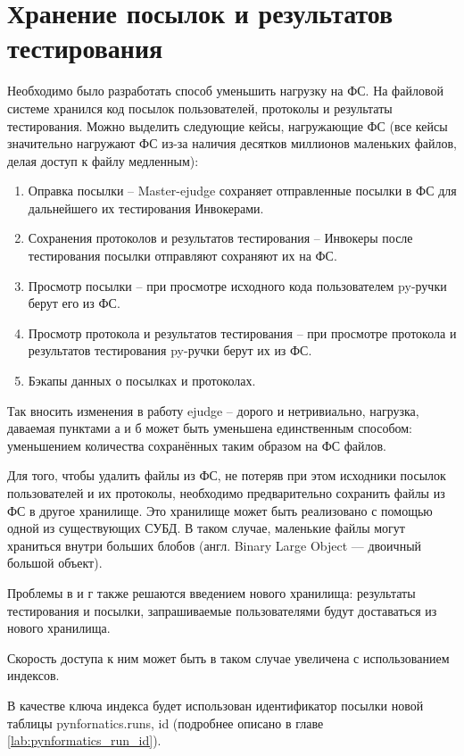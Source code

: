 \section{Хранение посылок и результатов тестирования}

Необходимо было разработать способ уменьшить нагрузку на ФС.
На файловой системе хранился код посылок пользователей,
протоколы и результаты тестирования.
Можно выделить следующие кейсы, нагружающие ФС (все кейсы значительно нагружают ФС из-за наличия десятков миллионов маленьких файлов, делая доступ к файлу медленным):

\begin{enumerate}
    \item Оправка посылки -- Master-ejudge сохраняет отправленные посылки в ФС для дальнейшего их тестирования Инвокерами.
    \item Сохранения протоколов и результатов тестирования -- Инвокеры после тестирования посылки отправляют сохраняют их на ФС.
    \item Просмотр посылки -- при просмотре исходного кода пользователем py-ручки берут его из ФС.
    \item Просмотр протокола и результатов тестирования -- при просмотре протокола и результатов тестирования py-ручки берут их из ФС.
    \item Бэкапы данных о посылках и протоколах.
\end{enumerate}

Так вносить изменения в работу ejudge -- дорого и нетривиально, 
нагрузка, даваемая пунктами а и б может быть уменьшена единственным способом:
уменьшением количества сохранённых таким образом на ФС файлов.

Для того, чтобы удалить файлы из ФС, 
не потеряв при этом исходники посылок пользователей и их протоколы, 
необходимо предварительно сохранить файлы из ФС в другое хранилище.
Это хранилище может быть реализовано с помощью одной из существующих СУБД.
В таком случае, маленькие файлы могут храниться внутри больших блобов (англ. Binary Large Object — двоичный большой объект).

Проблемы в и г также решаются введением нового хранилища:
результаты тестирования и посылки, запрашиваемые пользователями будут доставаться из нового хранилища.

Скорость доступа к ним может быть в таком случае увеличена с использованием индексов.

В качестве ключа индекса будет использован идентификатор посылки новой таблицы pynfornatics.runs, id (подробнее описано в главе \ref{lab:pynformatics_run_id}).

